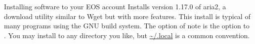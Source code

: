 \begin{block}{Installing software to your EOS account}
  Installs version 1.17.0 of aria2, a download utility similar to Wget but with more features. This install is typical of many programs using the GNU build system. The option of note is the  option to . You may install to any directory you like, but \url{\~/.local} is a common convention. \\
  \begin{indented}
    {\scriptsize \inputminted[tabsize=2,frame=single]{bash}{../common/install-aria2.bash}}
  \end{indented}
\end{block}
